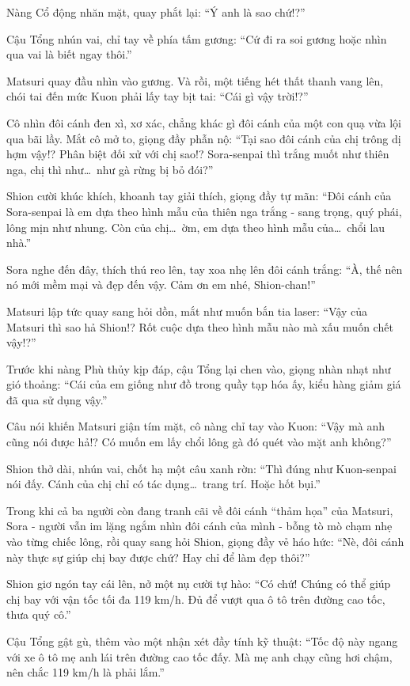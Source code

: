\documentclass[../main.tex]{subfiles}
\begin{document}
Nàng Cổ động nhăn mặt, quay phắt lại: ``Ý anh là sao chứ!?''

Cậu Tổng nhún vai, chỉ tay về phía tấm gương: ``Cứ đi ra soi gương hoặc nhìn qua vai là biết ngay thôi.''

Matsuri quay đầu nhìn vào gương. Và rồi, một tiếng hét thất thanh vang lên, chói tai đến mức Kuon phải lấy tay bịt tai: ``Cái gì vậy trời!?''

Cô nhìn đôi cánh đen xì, xơ xác, chẳng khác gì đôi cánh của một con quạ vừa lội qua bãi lầy. Mắt cô mở to, giọng đầy phẫn nộ: ``Tại sao đôi cánh của chị trông dị hợm vậy!? Phân biệt đối xử với chị sao!? Sora-senpai thì trắng muốt như thiên nga, chị thì như\dots\ như gà rừng bị bỏ đói?''

Shion cười khúc khích, khoanh tay giải thích, giọng đầy tự mãn: ``Đôi cánh của Sora-senpai là em dựa theo hình mẫu của thiên nga trắng - sang trọng, quý phái, lông mịn như nhung. Còn của chị\dots\ ờm, em dựa theo hình mẫu của\dots\ chổi lau nhà.''

Sora nghe đến đây, thích thú reo lên, tay xoa nhẹ lên đôi cánh trắng: ``À, thế nên nó mới mềm mại và đẹp đến vậy. Cảm ơn em nhé, Shion-chan!''

Matsuri lập tức quay sang hỏi dồn, mắt như muốn bắn tia laser: ``Vậy của Matsuri thì sao hả Shion!? Rốt cuộc dựa theo hình mẫu nào mà xấu muốn chết vậy!?''

Trước khi nàng Phù thủy kịp đáp, cậu Tổng lại chen vào, giọng nhàn nhạt như gió thoảng: ``Cái của em giống như đồ trong quầy tạp hóa ấy, kiểu hàng giảm giá đã qua sử dụng vậy.''

Câu nói khiến Matsuri giận tím mặt, cô nàng chỉ tay vào Kuon: ``Vậy mà anh cũng nói được hả!? Có muốn em lấy chổi lông gà đó quét vào mặt anh không?''

Shion thở dài, nhún vai, chốt hạ một câu xanh rờn: ``Thì đúng như Kuon-senpai nói đấy. Cánh của chị chỉ có tác dụng\dots\ trang trí. Hoặc hốt bụi.''

Trong khi cả ba người còn đang tranh cãi về đôi cánh ``thảm họa'' của Matsuri, Sora - người vẫn im lặng ngắm nhìn đôi cánh của mình - bỗng tò mò chạm nhẹ vào từng chiếc lông, rồi quay sang hỏi Shion, giọng đầy vẻ háo hức: ``Nè, đôi cánh này thực sự giúp chị bay được chứ? Hay chỉ để làm đẹp thôi?''

Shion giơ ngón tay cái lên, nở một nụ cười tự hào: ``Có chứ! Chúng có thể giúp chị bay với vận tốc tối đa 119 km/h. Đủ để vượt qua ô tô trên đường cao tốc, thưa quý cô.''

Cậu Tổng gật gù, thêm vào một nhận xét đầy tính kỹ thuật: ``Tốc độ này ngang với xe ô tô mẹ anh lái trên đường cao tốc đấy. Mà mẹ anh chạy cũng hơi chậm, nên chắc 119 km/h là phải lắm.''
\end{document}
